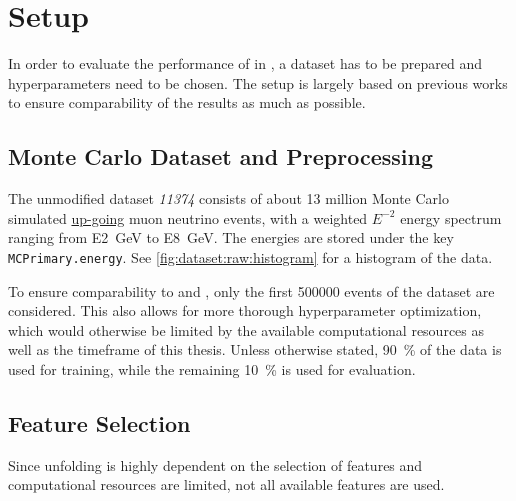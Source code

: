 \section{Setup}
In order to evaluate the performance of \corn{} in \dsea{},
a dataset has to be prepared
and hyperparameters need to be chosen.
%
The setup is largely based on previous works
  \cite{dsea_jan, dsea_samuel}
to ensure comparability of the results
  as much as possible.


\subsection{Monte Carlo Dataset and Preprocessing}
%
%
The unmodified dataset \emph{11374} \cite{icecube_mc} consists of about 13 million Monte Carlo simulated
  \hyperref[sec:neutrino_astronomy:icecube:up_going]{up-going}
  muon neutrino events,
with a weighted $E^{-2}$ energy spectrum
ranging from \SI{E2}{\giga\electronvolt} to \SI{E8}{\giga\electronvolt}.
The energies are stored under the key \texttt{MCPrimary.energy}.
See \autoref{fig:dataset:raw:histogram} for a histogram of the data.

To ensure comparability to \cite{dsea_jan} and \cite{dsea_samuel}, %
only the first \num{500000} events of the dataset are considered.
This also allows for more thorough hyperparameter optimization,
which would otherwise be limited by the available computational resources as well as the timeframe of this thesis.
%
Unless otherwise stated, %
\SI{90}{\percent} of the data is used for training,
while the remaining \SI{10}{\percent} is used for evaluation.


\subsection{Feature Selection}
Since
  unfolding is highly dependent on the selection of features \citationneeded{}
  and computational resources are limited,
not all available features are used.


